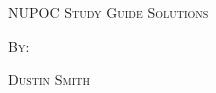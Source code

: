 \documentclass[dvipsnames]{article}%
\begin{document}
\begin{center}
  \vspace*{\fill}
  \textsc{NUPOC Study Guide Solutions}
  \bigskip

  \textsc{By:}
  \bigskip
  
  \textsc{\LARGE Dustin Smith}
  \vspace*{\fill}
\end{center}

\newpage

\tableofcontents

\newpage




\end{document}
